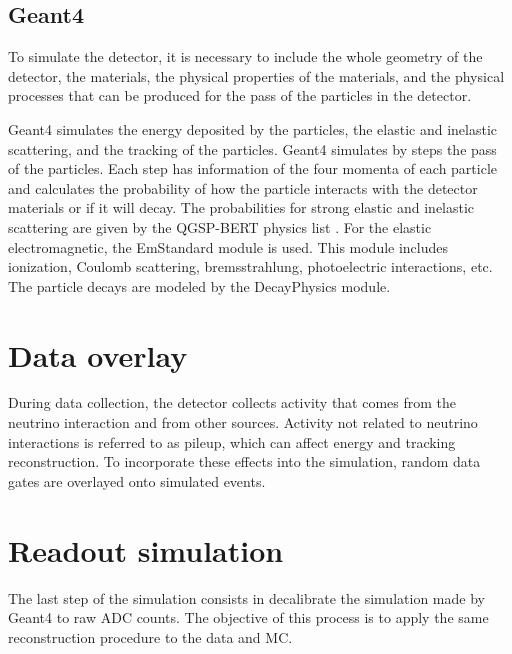 \subsection{Geant4}
\label{Cap:Simulation:GEANT4}

To simulate the detector, it is necessary to include the whole geometry of the detector, the materials, the physical properties of the materials, and the physical processes that can be produced for the pass of the particles in the detector. 

Geant4 simulates the energy deposited by the particles, the elastic and inelastic scattering, and the tracking of the particles. Geant4 simulates by steps the pass of the particles. Each step has information of the four momenta of each particle and calculates the probability of how the particle interacts with the detector materials or if it will decay. 
The probabilities for strong elastic and inelastic scattering are given by the QGSP-BERT physics list \cite{1968Nuc} \cite{BERTINI1971670} \cite{Braun:1995pi} \cite{Alexander}. For the elastic electromagnetic, the EmStandard module is used. This module includes ionization, Coulomb scattering,  bremsstrahlung, photoelectric interactions, etc. The particle decays are modeled by the DecayPhysics module.

\section{Data overlay}
\label{Cap:Simulation:DataOverlay}
During data collection, the detector collects activity that comes from the neutrino interaction and from other sources. Activity not related to neutrino interactions is referred to as pileup, which can affect energy and tracking reconstruction. To incorporate these effects into the simulation, random data gates are overlayed onto simulated events.


\section{Readout simulation}
\label{Cap:Simulation:ReadoutSim}

The last step of the simulation consists in decalibrate the simulation made by Geant4 to raw ADC counts. The objective of this process is to apply the same reconstruction procedure to the data and MC. 

